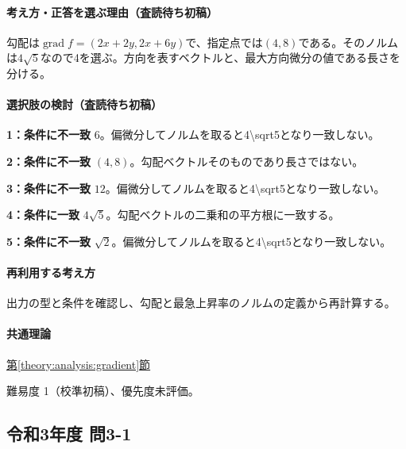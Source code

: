 \paragraph{考え方・正答を選ぶ理由（査読待ち初稿）} 勾配は\(\operatorname{grad}f=(2x+2y,2x+6y)\)で、指定点では\((4,8)\)である。そのノルムは\(4\sqrt5\)なので4を選ぶ。方向を表すベクトルと、最大方向微分の値である長さを分ける。

\paragraph{選択肢の検討（査読待ち初稿）}\mbox{}\par

\noindent\textbf{1：条件に不一致} \(6\)。偏微分してノルムを取ると4\textbackslash{}sqrt5となり一致しない。\par

\noindent\textbf{2：条件に不一致} \((4,8)\)。勾配ベクトルそのものであり長さではない。\par

\noindent\textbf{3：条件に不一致} \(12\)。偏微分してノルムを取ると4\textbackslash{}sqrt5となり一致しない。\par

\noindent\textbf{4：条件に一致} \(4\sqrt5\)。勾配ベクトルの二乗和の平方根に一致する。\par

\noindent\textbf{5：条件に不一致} \(\sqrt2\)。偏微分してノルムを取ると4\textbackslash{}sqrt5となり一致しない。\par

\paragraph{再利用する考え方} 出力の型と条件を確認し、勾配と最急上昇率のノルムの定義から再計算する。

\paragraph{共通理論} \hyperref[theory:analysis:gradient]{第\ref*{theory:analysis:gradient}節}

\par 難易度 1（校準初稿）、優先度未評価。

\subsection{令和3年度 問3-1}
\label{q:r03-reg-basic-3-1}

